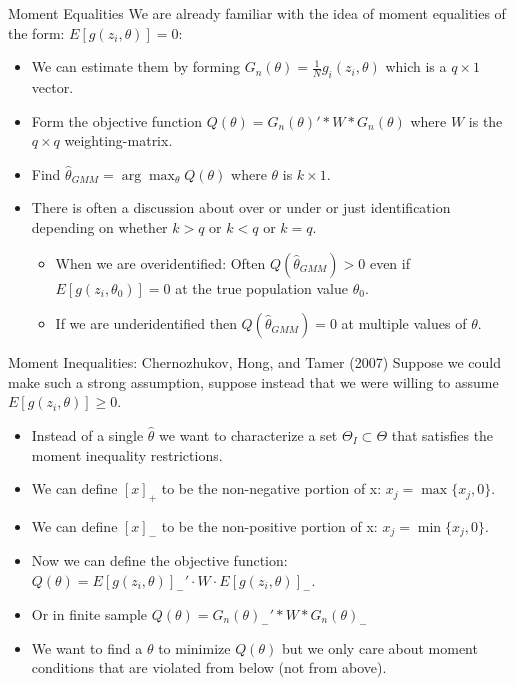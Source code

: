 \documentclass[xcolor=pdftex,dvipsnames,table,mathserif]{beamer}
\begin{document}
\begin{frame}{Moment Equalities}
We are already familiar with the idea of  \alert{moment equalities} of the form: $E[g(z_i,\theta)] = 0$:
\begin{itemize}
\item We can estimate them by forming $G_n(\theta)= \frac{1}{N} g_i(z_i,\theta)$  which is a $q \times 1$ vector.
\item Form the objective function $Q(\theta) = G_n(\theta)' * W * G_n(\theta)$ where $W$ is the $q \times q$ weighting-matrix.
\item Find $\hat{\theta}_{GMM} = \arg \max_{\theta} Q(\theta)$ where $\theta$ is $k \times 1$.
\item There is often a discussion about \alert{over} or \alert{under} or \alert{just} identification depending on whether $k > q$ or $k < q$ or $k=q$.
\begin{itemize}
\item When we are \alert{overidentified}: Often $Q(\hat{\theta}_{GMM}) > 0$ even if $E[g(z_i,\theta_0)]=0$ at the true population value $\theta_0$.
\item If we are \alert{underidentified} then $Q(\hat{\theta}_{GMM}) = 0$ at multiple values of $\theta$.
\end{itemize}
\end{itemize}
\end{frame}


\begin{frame}{Moment Inequalities: Chernozhukov, Hong, and Tamer (2007)}
Suppose we could make such a strong assumption, suppose instead that we were willing to assume $E[g(z_i,\theta)] \geq 0$.
\begin{itemize}
\item Instead of a single $\hat{\theta}$ we want to characterize a set $\Theta_I \subset \Theta$ that satisfies the moment inequality restrictions.
\item We can define $[x]_{+}$ to be the \alert{non-negative portion of x}: $x_j=\max\{x_j,0\}$.
\item We can define $[x]_{-}$ to be the \alert{non-positive portion of x}: $x_j=\min\{x_j,0\}$.
\item Now we can define the objective function: $Q(\theta) = E[g(z_i,\theta)]_{-}' \cdot W \cdot E[g(z_i,\theta)]_{-}$.
\item Or in finite sample $Q(\theta) = G_n(\theta)_{-}' * W * G_n(\theta)_{-}$
\item We want to find a $\theta$ to minimize $Q(\theta)$ but we only care about moment conditions that are violated from below (not from above).
\end{itemize}
\end{frame}
\end{document}
